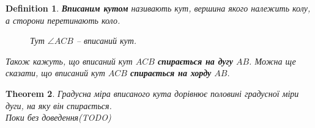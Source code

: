 \documentclass[a4paper, 10pt]{article}
\theoremstyle{theoremdd}
\newtheorem{theorem}{Theorem}[subsection]
\theoremstyle{theoremdd}
\theoremstyle{theoremdd}
\newtheorem{definition}[theorem]{Definition}
\theoremstyle{theoremdd}
\theoremstyle{theoremdd}
\theoremstyle{theoremdd}
\theoremstyle{theoremdd}
\theoremstyle{theoremdd}
\theoremstyle{theoremdd}
\begin{document}
\begin{definition}
\textbf{Вписаним кутом} називають кут, вершина якого належить колу, а сторони перетинають коло.
\begin{figure}[H]
\centering
{}
\caption*{Тут $\angle ACB$ -- вписаний кут.}
\end{figure}
Також кажуть, що вписаний кут $ACB$ \textbf{спирається на дугу} $AB$. Можна ще сказати, що вписаний кут $ACB$ \textbf{спирається на хорду} $AB$.
\end{definition}

\begin{theorem}
Градусна міра вписаного кута дорівнює половині градусної міри дуги, на яку він спирається.\\
\textit{Поки без доведення}(TODO)
\end{theorem}
\end{document}
